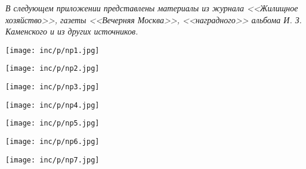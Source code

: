 
\vspace*{70pt}

\noindent
\begin{center}
\begin{minipage}{65mm}
\textit{В следующем приложении представлены материалы из журнала <<Жилищное хозяйство>>, газеты <<Вечерняя Москва>>, <<наградного>> альбома И. З. Каменского и из других источников.}
\end{minipage}
\end{center}

\vspace{49pt}

\noindent
\texttt{[image: inc/p/np1.jpg]}

\newpage

\noindent
\texttt{[image: inc/p/np2.jpg]}

\newpage

\noindent
\noindent\texttt{[image: inc/p/np3.jpg]}

\newpage

\noindent
\texttt{[image: inc/p/np4.jpg]}

\newpage

\noindent
\texttt{[image: inc/p/np5.jpg]}

\newpage

\noindent
\texttt{[image: inc/p/np6.jpg]}

\newpage

\noindent
\texttt{[image: inc/p/np7.jpg]}

\newpage
